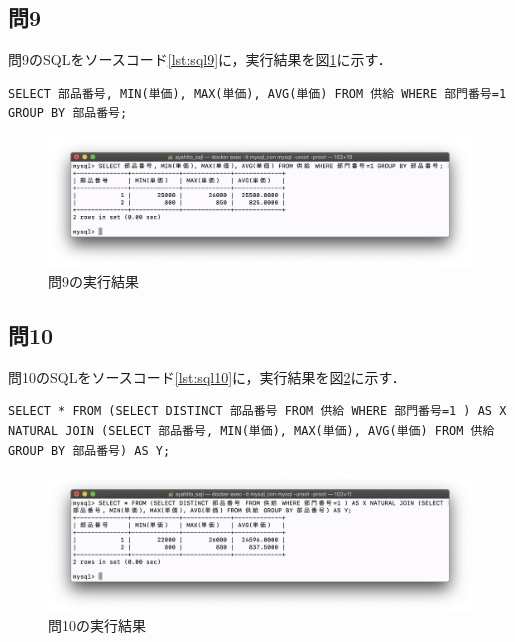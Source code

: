 \documentclass[uplatex]{jsarticle}
\begin{document}
\subsection{問9}
問9のSQLをソースコード\ref{lst:sql9}に，実行結果を図\ref{fig:ans9}に示す．
\begin{lstlisting}[caption=問9のSQL,label=lst:sql9]
SELECT 部品番号, MIN(単価), MAX(単価), AVG(単価) FROM 供給 WHERE 部門番号=1 GROUP BY 部品番号;
\end{lstlisting}
\begin{figure}[htb]
\begin{center}
\includegraphics[width=120mm]{figures/ans9.png}
\caption{問9の実行結果}
\label{fig:ans9}
\end{center}
\end{figure}

\subsection{問10}
問10のSQLをソースコード\ref{lst:sql10}に，実行結果を図\ref{fig:ans10}に示す．
\begin{lstlisting}[caption=問10のSQL,label=lst:sql10]
SELECT * FROM (SELECT DISTINCT 部品番号 FROM 供給 WHERE 部門番号=1 ) AS X NATURAL JOIN (SELECT 部品番号, MIN(単価), MAX(単価), AVG(単価) FROM 供給 GROUP BY 部品番号) AS Y;
\end{lstlisting}
\begin{figure}[htb]
\begin{center}
\includegraphics[width=120mm]{figures/ans10.png}
\caption{問10の実行結果}
\label{fig:ans10}
\end{center}
\end{figure}
\end{document}
